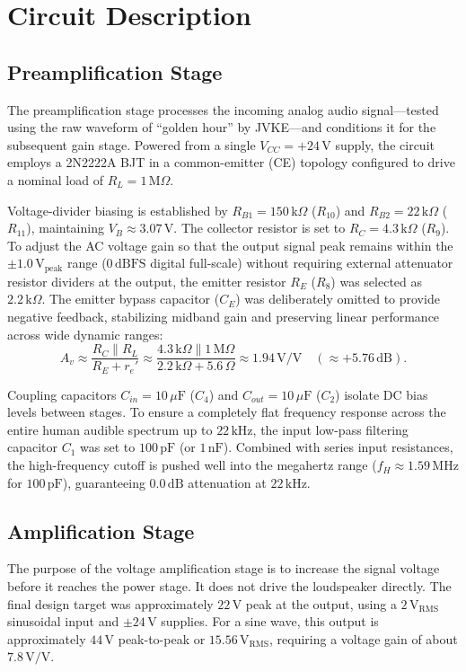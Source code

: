 \documentclass[conference]{IEEEtran}
\begin{document}
\section{Circuit Description}

\subsection{Preamplification Stage}
The preamplification stage processes the incoming analog audio signal—tested using the raw waveform of ``golden hour'' by JVKE—and conditions it for the subsequent gain stage. Powered from a single $V_{CC} = +24\,\mathrm{V}$ supply, the circuit employs a 2N2222A BJT in a common-emitter (CE) topology configured to drive a nominal load of $R_L = 1\,\mathrm{M}\Omega$.

Voltage-divider biasing is established by $R_{B1} = 150\,\mathrm{k}\Omega$ ($R_{10}$) and $R_{B2} = 22\,\mathrm{k}\Omega$ ($R_{11}$), maintaining $V_B \approx 3.07\,\mathrm{V}$. The collector resistor is set to $R_C = 4.3\,\mathrm{k}\Omega$ ($R_9$). To adjust the AC voltage gain so that the output signal peak remains within the $\pm1.0\,\mathrm{V_{peak}}$ range ($0\,\mathrm{dBFS}$ digital full-scale) without requiring external attenuator resistor dividers at the output, the emitter resistor $R_E$ ($R_8$) was selected as $2.2\,\mathrm{k}\Omega$. The emitter bypass capacitor ($C_E$) was deliberately omitted to provide negative feedback, stabilizing midband gain and preserving linear performance across wide dynamic ranges:
\begin{equation}
 A_v \approx \frac{R_C \parallel R_L}{R_E + r_e'} \approx \frac{4.3\,\mathrm{k}\Omega \parallel 1\,\mathrm{M}\Omega}{2.2\,\mathrm{k}\Omega + 5.6\,\Omega} \approx 1.94\,\mathrm{V/V} \quad (\approx +5.76\,\mathrm{dB}).
\end{equation}

Coupling capacitors $C_{in} = 10\,\mu\mathrm{F}$ ($C_4$) and $C_{out} = 10\,\mu\mathrm{F}$ ($C_2$) isolate DC bias levels between stages. To ensure a completely flat frequency response across the entire human audible spectrum up to $22\,\mathrm{kHz}$, the input low-pass filtering capacitor $C_1$ was set to $100\,\mathrm{pF}$ (or $1\,\mathrm{nF}$). Combined with series input resistances, the high-frequency cutoff is pushed well into the megahertz range ($f_H \approx 1.59\,\mathrm{MHz}$ for $100\,\mathrm{pF}$), guaranteeing $0.0\,\mathrm{dB}$ attenuation at $22\,\mathrm{kHz}$.

\subsection{Amplification Stage}
The purpose of the voltage amplification stage is to increase the signal voltage before it reaches the power stage. It does not drive the loudspeaker directly. The final design target was approximately $22\,\mathrm{V}$ peak at the output, using a $2\,\mathrm{V_{RMS}}$ sinusoidal input and $\pm24\,\mathrm{V}$ supplies. For a sine wave, this output is approximately $44\,\mathrm{V}$ peak-to-peak or $15.56\,\mathrm{V_{RMS}}$, requiring a voltage gain of about $7.8\,\mathrm{V/V}$.
\end{document}
